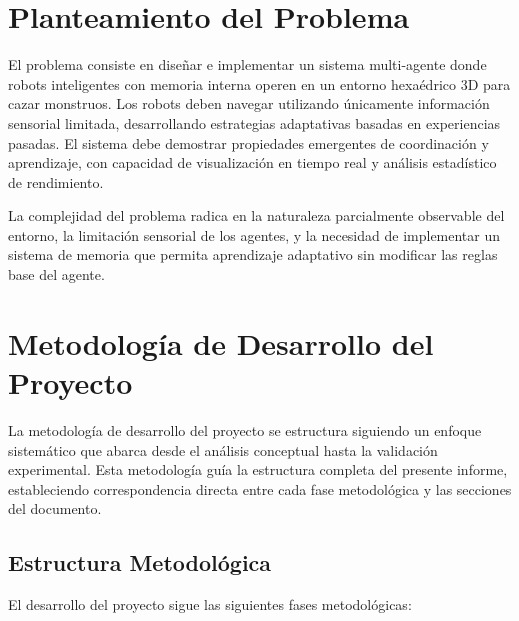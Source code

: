 \documentclass[10pt,twocolumn]{article}
\begin{document}
\section{Planteamiento del Problema}

El problema consiste en diseñar e implementar un sistema multi-agente donde robots inteligentes con memoria interna operen en un entorno hexaédrico 3D para cazar monstruos. Los robots deben navegar utilizando únicamente información sensorial limitada, desarrollando estrategias adaptativas basadas en experiencias pasadas. El sistema debe demostrar propiedades emergentes de coordinación y aprendizaje, con capacidad de visualización en tiempo real y análisis estadístico de rendimiento.

La complejidad del problema radica en la naturaleza parcialmente observable del entorno, la limitación sensorial de los agentes, y la necesidad de implementar un sistema de memoria que permita aprendizaje adaptativo sin modificar las reglas base del agente.

\section{Metodología de Desarrollo del Proyecto}

La metodología de desarrollo del proyecto se estructura siguiendo un enfoque sistemático que abarca desde el análisis conceptual hasta la validación experimental. Esta metodología guía la estructura completa del presente informe, estableciendo correspondencia directa entre cada fase metodológica y las secciones del documento.

\subsection{Estructura Metodológica}

El desarrollo del proyecto sigue las siguientes fases metodológicas:
\end{document}
